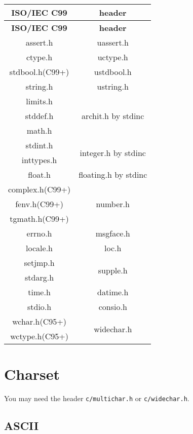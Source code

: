 \begin{center}\begin{longtable}{|c|c|}
	\hline
	\textbf{ISO/IEC C99\cite{StdC99}} & \textbf{header} \\
	\hline\endfirsthead\hline
	\textbf{ISO/IEC C99\cite{StdC99}} & \textbf{header} \\
	\hline\endhead\hline\endfoot\hline\endlastfoot
	assert.h & uassert.h \\\hline
	ctype.h & uctype.h \\\hline
	stdbool.h(C99+) & ustdbool.h \\\hline
	string.h & ustring.h \\\hline
	limits.h & \multirow{3}{*}{archit.h by stdinc} \\\cline{1-1}
	stddef.h & \\\cline{1-1}
	math.h & \\\hline
	stdint.h & \multirow{2}{*}{integer.h by stdinc} \\\cline{1-1}
	inttypes.h & \\\hline
	float.h & floating.h by stdinc \\\hline
	complex.h(C99+) & \multirow{3}{*}{number.h} \\\cline{1-1}
	fenv.h(C99+) & \\\cline{1-1}
	tgmath.h(C99+) & \\\hline
	errno.h & msgface.h \\\hline
	locale.h & loc.h \\\hline
	setjmp.h & \multirow{2}{*}{supple.h} \\\cline{1-1}
	stdarg.h & \\\hline
	time.h & datime.h \\\hline
	stdio.h & consio.h \\\hline
	wchar.h(C95+) & \multirow{2}{*}{widechar.h} \\\cline{1-1}
	wctype.h(C95+) & \\\hline
\end{longtable}\end{center}

\section{Charset}

You may need the header \verb|c/multichar.h| or \verb|c/widechar.h|.

\subsection{ASCII}

